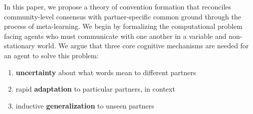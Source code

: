 In this paper, we propose a theory of convention formation that reconciles community-level consensus with partner-specific common ground through the process of meta-learning.
We begin by formalizing the computational problem facing agents who must communicate with one another in a variable and non-stationary world. 
We argue that three core cognitive mechanisms are needed for an agent to solve this problem: 
\begin{enumerate}
\item \textbf{uncertainty} about what words mean to different partners
\item rapid \textbf{adaptation} to particular partners, in context
\item  inductive \textbf{generalization} to unseen partners
\end{enumerate}

